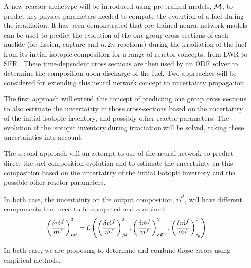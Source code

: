 \documentclass[dvips,12pt]{article}
\begin{document}
A new reactor archetype will be introduced 
using pre-trained models, ${\cal M}$, to predict
key physics parameters needed to compute the
evolution of a fuel during the irradiation. It has
been demonstrated that pre-trained neural network
models can be used to predict the evolution of the
one group cross sections of each nuclide (for
fission, capture and $n,2n$ reactions) during the
irradiation of the fuel from its initial isotopic
composition for a range of reactor concepts, from
LWR to SFR \cite{Leniau Neural networks, Leniau.PHYSOR.2016}.
These time-dependent cross sections are then used
by an ODE solver to determine the composition
upon discharge of the fuel. Two approaches will 
be considered for extending this neural network 
concept to uncertainty propagation.


The first approach will extend this concept of
predicting one group cross sections to also
estimate the uncertainty in those cross-sections
based on the uncertainty of the initial isotopic
inventory, and possibly other reactor parameters.
The evolution of the isotopic inventory during
irradiation will be solved, taking these
uncertainties into account.%

The second approach will an attempt to use of the
neural network to predict direct the fuel
composition evolution and to estimate the
uncertainty on this composition based on the
uncertainty of the initial isotopic inventory and
the possible other reactor parameters.

In both case, the uncertainty on the output
composition, $\vec{m}^{f}$, will have different
compoments that need to be computed and combined:
\begin{equation}
  \left( \frac{\delta \vec{m}^{f}}{\vec{m}^{f}} \right)^{2} _{tot} =
  {\cal C}\left(  \left( \frac{\delta \vec{m}^{f}}{\vec{m}^{f}} \right)^{2} _{{\cal M}},
                  \left( \frac{\delta \vec{m}^{f}}{\vec{m}^{f}} \right)^{2} _{\delta \vec{m}^{i} },
                  \left( \frac{\delta \vec{m}^{f}}{\vec{m}^{f}} \right)^{2} _{\tau_p} \right)
\end{equation}

In both case, we are proposing to determine and
combine those errors using empirical methods.
\end{document}
